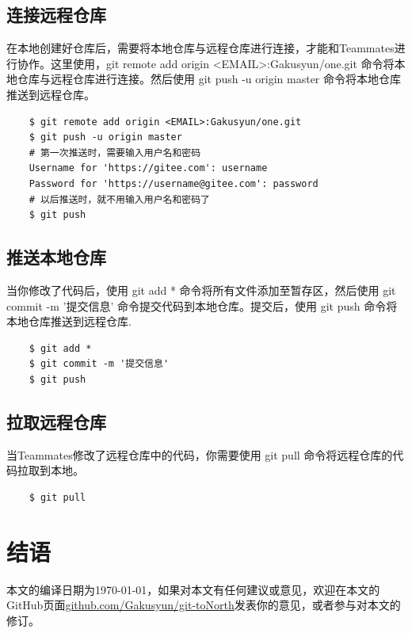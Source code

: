 \documentclass[UTF8]{ctexart}
\begin{document}
\subsection{连接远程仓库}
在本地创建好仓库后，需要将本地仓库与远程仓库进行连接，才能和Teammates进行协作。这里使用，git remote add origin <EMAIL>:Gakusyun/one.git 命令将本地仓库与远程仓库进行连接。然后使用 git push -u origin master 命令将本地仓库推送到远程仓库。
\begin{verbatim}
    $ git remote add origin <EMAIL>:Gakusyun/one.git
    $ git push -u origin master
    # 第一次推送时，需要输入用户名和密码
    Username for 'https://gitee.com': username
    Password for 'https://username@gitee.com': password
    # 以后推送时，就不用输入用户名和密码了
    $ git push
\end{verbatim}
\subsection{推送本地仓库}
当你修改了代码后，使用 git add * 命令将所有文件添加至暂存区，然后使用 git commit -m '提交信息' 命令提交代码到本地仓库。提交后，使用 git push 命令将本地仓库推送到远程仓库.
\begin{verbatim}
    $ git add *
    $ git commit -m '提交信息'
    $ git push
\end{verbatim}
\subsection{拉取远程仓库}
当Teammates修改了远程仓库中的代码，你需要使用 git pull 命令将远程仓库的代码拉取到本地。
\begin{verbatim}
    $ git pull
\end{verbatim}
\section{结语}
本文的编译日期为\today，如果对本文有任何建议或意见，欢迎在本文的GitHub页面\href{http://github.com/Gakusyun/git-toNorth}{github.com/Gakusyun/git-toNorth}发表你的意见，或者参与对本文的修订。
\end{document}

